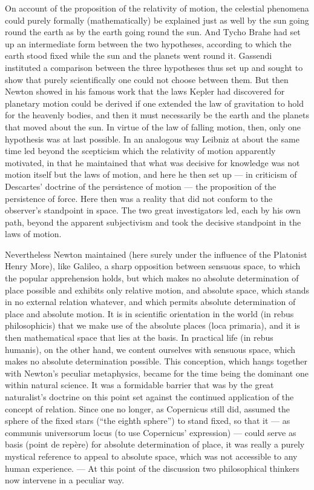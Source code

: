 \documentclass[12pt]{article}
\newcommand{\opage}[1]{\marginnote{\footnotesize\textit{[#1]}}}
\begin{document}
On account of the proposition of the relativity of motion, the celestial
phenomena could purely formally (mathematically) be explained just \opage{66}as well
by the sun going round the earth as by the earth going round the sun. And
Tycho Brahe had set up an intermediate form between the two hypotheses,
according to which the earth stood fixed while the sun and the planets went
round it. Gassendi instituted a comparison between the three hypotheses thus
set up and sought to show that purely scientifically one could not choose
between them. But then Newton showed in his famous work that the laws Kepler
had discovered for planetary motion could be derived if one extended the law
of gravitation to hold for the heavenly bodies, and then it must necessarily
be the earth and the planets that moved about the sun. In virtue of the law
of falling motion, then, only one hypothesis was at last possible. In an
analogous way Leibniz at about the same time led beyond the scepticism which
the relativity of motion apparently motivated, in that he maintained that
what was decisive for knowledge was not motion itself but the laws of
motion, and here he then set up --- in criticism of Descartes' doctrine of
the persistence of motion --- the proposition of the persistence of force.
Here then was a reality that did not conform to the observer's standpoint in
space. The two great investigators led, each by his own path, beyond the
apparent subjectivism and took the decisive standpoint in the laws of
motion.

Nevertheless Newton maintained (here surely under the influence of the
Platonist Henry More), like Galileo, a sharp opposition between sensuous
space, to which the popular apprehension holds, but which makes no absolute
determination of place possible and exhibits only relative motion, and
absolute space, which stands in no external relation whatever, and which
permits absolute determination of place and absolute motion. It is in
scientific orientation in the world (in rebus philosophicis) that we \opage{67}make
use of the absolute places (loca primaria), and it is then mathematical
space that lies at the basis. In practical life (in rebus humanis), on the
other hand, we content ourselves with sensuous space, which makes no
absolute determination possible. This conception, which hangs together with
Newton's peculiar metaphysics, became for the time being the dominant one
within natural science. It was a formidable barrier that was by the great
naturalist's doctrine on this point set against the continued application of
the concept of relation. Since one no longer, as Copernicus still did,
assumed the sphere of the fixed stars (``the eighth sphere'') to stand
fixed, so that it --- as communis universorum locus (to use Copernicus'
expression) --- could serve as basis (point de repère) for absolute
determination of place, it was really a purely mystical reference to appeal
to absolute space, which was not accessible to any human experience. --- At
this point of the discussion two philosophical thinkers now intervene in a
peculiar way.
\end{document}
